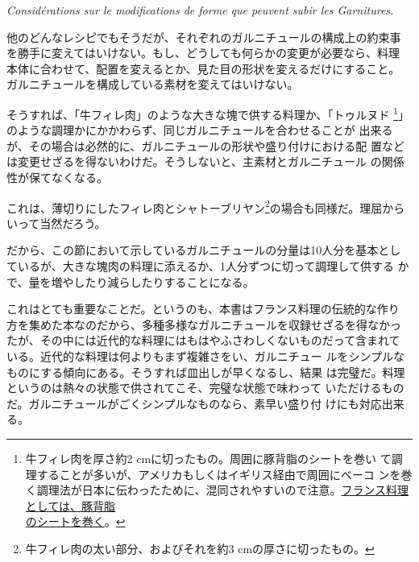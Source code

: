 \vspace{-1\zw}
\begin{center}
\textit{Considérations sur le modifications de forme que peuvent subir les Garnitures.}
\end{center}
\vspace{1\zw}


他のどんなレシピでもそうだが、それぞれのガルニチュールの構成上の約束事
を勝手に変えてはいけない。もし、どうしても何らかの変更が必要なら、料理
本体に合わせて、配置を変えるとか、見た目の形状を変えるだけにすること。
ガルニチュールを構成している素材を変えてはいけない。

そうすれば、「牛フィレ肉」のような大きな塊で供する料理か、「トゥルヌド
\footnote{牛フィレ肉を厚さ約2 cmに切ったもの。周囲に豚背脂のシートを巻い
  て調理することが多いが、アメリカもしくはイギリス経由で周囲にベーコ
  ンを巻く調理法が日本に伝わったために、混同されやすいので注意。\ul{フランス料理としては、豚背脂\\のシートを巻く}。}」のような調理かにかかわらず、同じガルニチュールを合わせることが
出来るが、その場合は必然的に、ガルニチュールの形状や盛り付けにおける配
置などは変更せざるを得ないわけだ。そうしないと、主素材とガルニチュール
の関係性が保てなくなる。

これは、薄切りにしたフィレ肉とシャトーブリヤン\footnote{牛フィレ肉の太い部分、およびそれを約3
  cmの厚さに切ったもの。}の場合も同様だ。理屈からいって当然だろう。

だから、この節において示しているガルニチュールの分量は10人分を基本とし
ているが、大きな塊肉の料理に添えるか、1人分ずつに切って調理して供する
かで、量を増やしたり減らしたりすることになる。

これはとても重要なことだ。というのも、本書はフランス料理の伝統的な作り
方を集めた本なのだから、多種多様なガルニチュールを収録せざるを得なかっ
たが、その中には近代的な料理にはもはやふさわしくないものだって含まれて
いる。近代的な料理は何よりもまず複雑さをい、ガルニチュー
ルをシンプルなものにする傾向にある。そうすれば皿出しが早くなるし、結果
は完璧だ。料理というのは熱々の状態で供されてこそ、完璧な状態で味わって
いただけるものだ。ガルニチュールがごくシンプルなものなら、素早い盛り付
けにも対応出来る。

